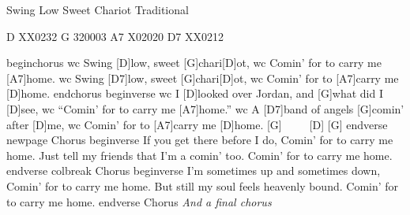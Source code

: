 Swing Low Sweet Chariot
Traditional





D XX0232
G 320003
A7 X02020
D7 XX0212


beginchorus
wc Swing [D]low, sweet [G]chari[D]ot,
wc Comin{\textquoteright} for to carry me [A7]home.
wc Swing [D7]low, sweet [G]chari[D]ot,
wc Comin{\textquoteright} for to [A7]carry me [D]home.
endchorus
beginverse
wc I [D]looked over Jordan, and [G]what did I [D]see,
wc    {\textquotedblleft}Comin{\textquoteright} for to carry me [A7]home.{\textquotedblright}
wc A [D7]band of angels [G]comin{\textquoteright} after [D]me,
wc    Comin{\textquoteright} for to [A7]carry me [D]home.     [G]~~~~~[D]     [G]
endverse
newpage
Chorus
beginverse
If you get there before I do,
   Comin{\textquoteright} for to carry me home.
Just tell my friends that I{\textquoteright}m a comin{\textquoteright} too.
   Comin{\textquoteright} for to carry me home.
endverse
colbreak
Chorus
beginverse
I{\textquoteright}m sometimes up and sometimes down,
   Comin{\textquoteright} for to carry me home.
But still my soul feels heavenly bound.
   Comin{\textquoteright} for to carry me home.
endverse
Chorus
\textit{And a final chorus}


